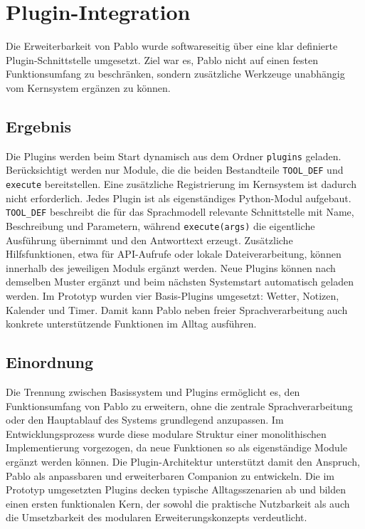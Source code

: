 \section{Plugin-Integration}

Die Erweiterbarkeit von Pablo wurde softwareseitig über eine klar definierte Plugin-Schnittstelle umgesetzt. 
Ziel war es, Pablo nicht auf einen festen Funktionsumfang zu beschränken, sondern zusätzliche Werkzeuge unabhängig vom Kernsystem ergänzen zu können.

\subsection{Ergebnis}

Die Plugins werden beim Start dynamisch aus dem Ordner \texttt{plugins} geladen. Berücksichtigt werden nur Module, die die beiden Bestandteile \texttt{TOOL\_DEF} und \texttt{execute} bereitstellen. Eine zusätzliche Registrierung im Kernsystem ist dadurch nicht erforderlich.
Jedes Plugin ist als eigenständiges Python-Modul aufgebaut. \texttt{TOOL\_DEF} beschreibt die für das Sprachmodell relevante Schnittstelle mit Name, Beschreibung und Parametern, während \texttt{execute(args)} die eigentliche Ausführung übernimmt und den Antworttext erzeugt. 
Zusätzliche Hilfsfunktionen, etwa für API-Aufrufe oder lokale Dateiverarbeitung, können innerhalb des jeweiligen Moduls ergänzt werden.
Neue Plugins können nach demselben Muster ergänzt und beim nächsten Systemstart automatisch geladen werden.
Im Prototyp wurden vier Basis-Plugins umgesetzt: Wetter, Notizen, Kalender und Timer. Damit kann Pablo neben freier Sprachverarbeitung auch konkrete unterstützende Funktionen im Alltag ausführen.

\subsection{Einordnung}

Die Trennung zwischen Basissystem und Plugins ermöglicht es, den Funktionsumfang von Pablo zu erweitern, ohne die zentrale Sprachverarbeitung oder den Hauptablauf des Systems grundlegend anzupassen. Im Entwicklungsprozess wurde diese modulare Struktur einer monolithischen Implementierung vorgezogen, da neue Funktionen so als eigenständige Module ergänzt werden können.
Die Plugin-Architektur unterstützt damit den Anspruch, Pablo als anpassbaren und erweiterbaren Companion zu entwickeln. Die im Prototyp umgesetzten Plugins decken typische Alltagsszenarien ab und bilden einen ersten funktionalen Kern, der sowohl die praktische Nutzbarkeit als auch die Umsetzbarkeit des modularen Erweiterungskonzepts verdeutlicht.